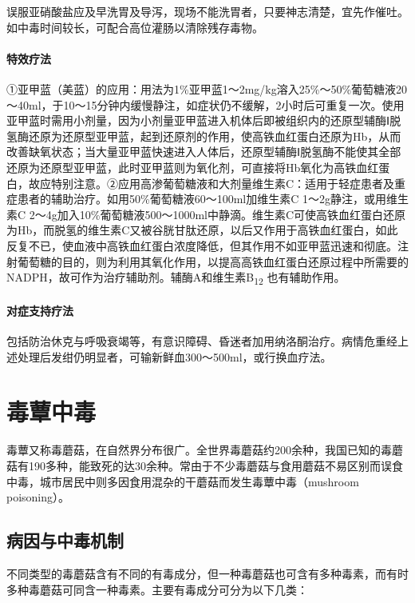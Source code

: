 误服亚硝酸盐应及早洗胃及导泻，现场不能洗胃者，只要神志清楚，宜先作催吐。如中毒时间较长，可配合高位灌肠以清除残存毒物。

\paragraph{特效疗法}

①亚甲蓝（美蓝）的应用：用法为1\%亚甲蓝1～2mg/kg溶入25\%～50\%葡萄糖液20～40ml，于10～15分钟内缓慢静注，如症状仍不缓解，2小时后可重复一次。使用亚甲蓝时需用小剂量，因为小剂量亚甲蓝进入机体后即被组织内的还原型辅酶Ⅰ脱氢酶还原为还原型亚甲蓝，起到还原剂的作用，使高铁血红蛋白还原为Hb，从而改善缺氧状态；当大量亚甲蓝快速进入人体后，还原型辅酶Ⅰ脱氢酶不能使其全部还原为还原型亚甲蓝，此时亚甲蓝则为氧化剂，可直接将Hb氧化为高铁血红蛋白，故应特别注意。②应用高渗葡萄糖液和大剂量维生素C：适用于轻症患者及重症患者的辅助治疗。如用50\%葡萄糖液60～100ml加维生素C
1～2g静注，或用维生素C
2～4g加入10\%葡萄糖液500～1000ml中静滴。维生素C可使高铁血红蛋白还原为Hb，而脱氢的维生素C又被谷胱甘肽还原，以后又作用于高铁血红蛋白，如此反复不已，使血液中高铁血红蛋白浓度降低，但其作用不如亚甲蓝迅速和彻底。注射葡萄糖的目的，则为利用其氧化作用，以提高高铁血红蛋白还原过程中所需要的NADPH，故可作为治疗辅助剂。辅酶A和维生素B\textsubscript{12}
也有辅助作用。

\paragraph{对症支持疗法}

包括防治休克与呼吸衰竭等，有意识障碍、昏迷者加用纳洛酮治疗。病情危重经上述处理后发绀仍明显者，可输新鲜血300～500ml，或行换血疗法。

\protect\hypertarget{text00163.html}{}{}

\section{毒蕈中毒}

毒蕈又称毒蘑菇，在自然界分布很广。全世界毒蘑菇约200余种，我国已知的毒蘑菇有190多种，能致死的达30余种。常由于不少毒蘑菇与食用蘑菇不易区别而误食中毒，城市居民中则多因食用混杂的干蘑菇而发生毒蕈中毒（mushroom
poisoning）。

\subsection{病因与中毒机制}

不同类型的毒蘑菇含有不同的有毒成分，但一种毒蘑菇也可含有多种毒素，而有时多种毒蘑菇可同含一种毒素。主要有毒成分可分为以下几类：

